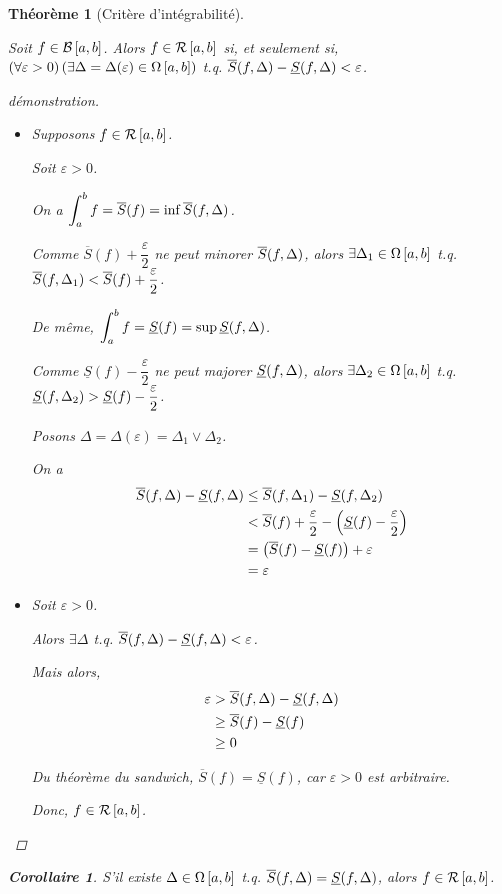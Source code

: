 \documentclass{report}
\newcommand*{\Ssup}[1]{\overline{S}(#1)}
\newcommand*{\Sinf}[1]{\underline{S}(#1)}
\newcommand*{\raffinement}[2]{#1 \vee #2}
\newcommand*{\eps}{\varepsilon}
\newtheorem*{thm}{Th\'eor\`eme}
\newtheorem*{coro}{Corollaire}
\theoremstyle{definition}
\theoremstyle{remark}
\begin{document}
	\begin{thm}[Crit\`ere d'int\'egrabilit\'e]
		~

		Soit $f \in \bornee$. Alors $f \in \riemann$ si, et seulement si, $\left( \forall \eps >0 \right) \left( \exists\Delta = \Delta(\eps) \in \partitions \right)$ t.q. $\ssup{f}-\sinf{f} < \eps$.
		\begin{proof}[d\'emonstration]~

			\begin{itemize}
				\item[$(\Rightarrow)$] Supposons $f \in \riemann$.

				Soit $\eps>0$.

				On a $\displaystyle\int_{a}^{b}f=\Ssup{f}=\inf\ssup{f}$.

				Comme $\Ssup{f}+\dfrac{\eps}{2}$ ne peut minorer $\ssup{f}$, alors $\exists\Delta_1 \in \partitions$ t.q. $\ssup{f}[\Delta_1] < \Ssup{f}+\dfrac{\eps}{2}$.

				De m\^eme, $\displaystyle\int_{a}^{b}f=\Sinf{f}=\sup\sinf{f}$.

				Comme $\Sinf{f}-\dfrac{\eps}{2}$ ne peut majorer $\sinf{f}$, alors $\exists\Delta_2 \in \partitions$ t.q. $\sinf{f}[\Delta_2] > \Sinf{f}-\dfrac{\eps}{2}$.

				Posons $\Delta = \Delta(\eps) = \raffinement{\Delta_1}{\Delta_2}$.

				On a
				\begin{align*}
					\ssup{f} - \sinf{f}&\leq \ssup{f}[\Delta_1] - \sinf{f}[\Delta_2]\\
					&< \Ssup{f} + \dfrac{\eps}{2} - \left( \Sinf{f} - \dfrac{\eps}{2} \right)\\
					&= \left( \Ssup{f} - \Sinf{f} \right) + \eps\\
					&= \eps
				\end{align*}
				\newpage
				\item[$(\Leftarrow)$] Soit $\eps>0$.

				Alors $\exists\Delta$ t.q. $\ssup{f}-\sinf{f}<\eps$.

				Mais alors,
				\begin{align*}
					\eps&> \ssup{f}-\sinf{f}\\
					&\geq \Ssup{f}-\Sinf{f}\\
					&\geq 0
				\end{align*}

				Du th\'eor\`eme du sandwich, $\Ssup{f}=\Sinf{f}$, car $\eps>0$ est arbitraire.

				Donc, $f \in \riemann$.
			\end{itemize}
		\end{proof}
		\begin{coro}
			S'il existe $\Delta \in \partitions$ t.q. $\ssup{f}=\sinf{f}$, alors $f \in \riemann$.
		\end{coro}
	\end{thm}
\end{document}
